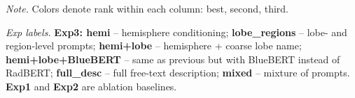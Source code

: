 \documentclass[a4paper,12pt]{article}
\begin{document}
\begin{table}[ht]
\begin{threeparttable}
\begin{tabular}{lccccccc}
\bottomrule
\end{tabular}

\begin{tablenotes}[flushleft]
\footnotesize
\item \textit{Note.} Colors denote rank within each column:
\colorbox{green!20}{best}, \colorbox{blue!20}{second}, \colorbox{orange!20}{third}.
\item \textit{Exp labels.} \textbf{Exp3: hemi} -- hemisphere conditioning; 
\textbf{lobe\_regions} -- lobe- and region-level prompts; 
\textbf{hemi+lobe} -- hemisphere + coarse lobe name; 
\textbf{hemi+lobe+BlueBERT} -- same as previous but with BlueBERT instead of RadBERT; 
\textbf{full\_desc} -- full free-text description; 
\textbf{mixed} -- mixture of prompts. 
\textbf{Exp1} and \textbf{Exp2} are ablation baselines.
\end{tablenotes}
\end{threeparttable}

\end{table}
\end{document}
